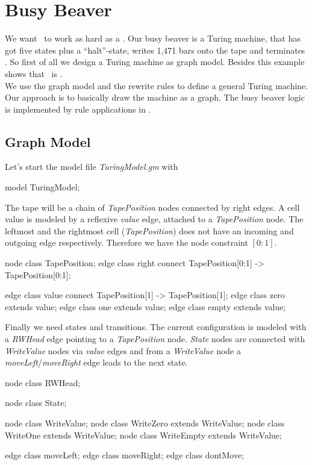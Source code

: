 \section{Busy Beaver}
We want \GrG\ to work as hard as a  \cite{Kro:07,Dew:84}. Our busy beaver is a Turing machine, that has got five states plus a ``halt''-state, writes 1,471 bars onto the tape and terminates \cite{MB:00}. So first of all we design a Turing machine as graph model. Besides this example shows that \GrG\ is . \\
We use the graph model and the rewrite rules to define a general Turing machine. Our approach is to basically draw the machine as a graph. The busy beaver logic is implemented by rule applications in \GrShell.

\subsection{Graph Model}
Let's start the model file \emph{TuringModel.gm} with
\begin{grgen}[firstnumber=1]
model TuringModel; 

\end{grgen}

The tape will be a chain of \emph{TapePosition} nodes connected by right edges. A cell value is modeled by a reflexive \emph{value} edge, attached to a \emph{TapePosition} node. The leftmost and the rightmost cell (\emph{TapePosition}) does not have an incoming and outgoing edge respectively. Therefore we have the node constraint $[0:1]$.
\begin{grgen}[firstnumber=last]
node class TapePosition; 
edge class right
  connect TapePosition[0:1] -> TapePosition[0:1];
  
edge class value
  connect TapePosition[1] -> TapePosition[1];  
edge class zero extends value;
edge class one extends value;
edge class empty extends value;

\end{grgen}
Finally we need states and transitions. The current configuration is modeled with a \emph{RWHead} edge pointing to a \emph{TapePosition} node. \emph{State} nodes are connected with \emph{WriteValue} nodes via \emph{value} edges and from a \emph{WriteValue} node a \emph{moveLeft}/\emph{moveRight} edge leads to the next state.
\begin{grgen}[firstnumber=last]
node class RWHead;

node class State;

node class WriteValue;
node class WriteZero extends WriteValue;
node class WriteOne extends WriteValue;
node class WriteEmpty extends WriteValue; 

edge class moveLeft;
edge class moveRight;
edge class dontMove;
\end{grgen}

